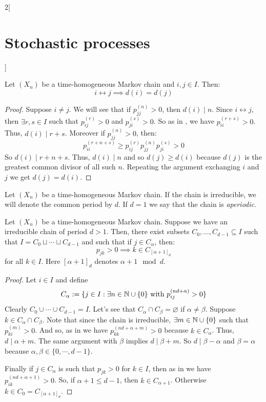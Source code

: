 \documentclass[../../../main_math.tex]{subfiles}
\begin{document}
\begin{multicols}{2}[\section{Stochastic processes}]
  \begin{proposition}\label{SP:period_classes}
    Let $(X_n)$ be a time-homogeneous Markov chain and $i,j\in I$. Then: $$i\leftrightarrow j\implies d(i)=d(j)$$
  \end{proposition}
  \begin{proof}
    Suppose $i\ne j$. We will see that if $p_{jj}^{(n)}>0$, then $d(i)\mid n$. Since $i\leftrightarrow j$, then $\exists r,s\in I$ such that $p_{ij}^{(r)}>0$ and $p_{ji}^{(s)}>0$. So as in , we have $p_{ii}^{(r+s)}>0$. Thus, $d(i)\mid r+s$. Moreover if $p_{jj}^{(n)}>0$, then:
    $$p_{ii}^{(r+n+s)}\geq p_{ij}^{(r)}p_{jj}^{(n)}p_{ji}^{(s)}>0$$
    So $d(i)\mid r+n+s$. Thus, $d(i)\mid n$ and so $d(j)\geq d(i)$ because $d(j)$ is the greatest common divisor of all such $n$. Repeating the argument exchanging $i$ and $j$ we get $d(j)= d(i)$.
  \end{proof}
  \begin{definition}
    Let $(X_n)$ be a time-homogeneous Markov chain. If the chain is irreducible, we will denote the common period by $d$. If $d=1$ we say that the chain is \emph{aperiodic}.
  \end{definition}
  \begin{proposition}
    Let $(X_n)$ be a time-homogeneous Markov chain. Suppose we have an irreducible chain of period $d>1$. Then, there exist subsets $C_0,\ldots,C_{d-1}\subseteq I$ such that $I=C_0\sqcup\cdots\sqcup C_{d-1}$ and such that if $j\in C_\alpha$, then:
    $$p_{jk}>0\implies k\in C_{{[\alpha+1]}_d}$$
    for all $k\in I$. Here ${[\alpha+1]}_d$ denotes $\alpha+1\mod{d}$.
  \end{proposition}
  \begin{proof}
    Let $i\in I$ and define
    $$C_\alpha:=\{j\in I:\exists n\in\mathbb{N}\cup\{0\}\text{ with }p_{ij}^{(n d+\alpha)}>0\}$$
    Clearly $C_0\cup\cdots\cup C_{d-1}=I$. Let's see that $C_\alpha\cap C_\beta=\varnothing$ if $\alpha\ne\beta$. Suppose $k\in C_\alpha\cap C_\beta$. Note that since the chain is irreducible, $\exists m\in\mathbb{N}\cup\{0\}$ such that $p_{ki}^{(m)}>0$. And so, as in  we have $p_{kk}^{(n d+\alpha+m)}>0$ because $k\in C_\alpha$. Thus, $d\mid \alpha+m$. The same argument with $\beta$ implies $d\mid \beta+m$. So $d\mid \beta -\alpha$ and $\beta=\alpha$ because $\alpha,\beta\in\{0,\cdots,d-1\}$.

    Finally if $j\in C_\alpha$ is such that $p_{jk}>0$ for $k\in I$, then as in  we have $p_{ik}^{(n d+\alpha +1)}>0$. So, if $\alpha+1\leq d-1$, then $k\in C_{\alpha+1}$. Otherwise $k\in C_0=C_{[\alpha+1]_d}$.
  \end{proof}

\end{multicols}
\end{document}
